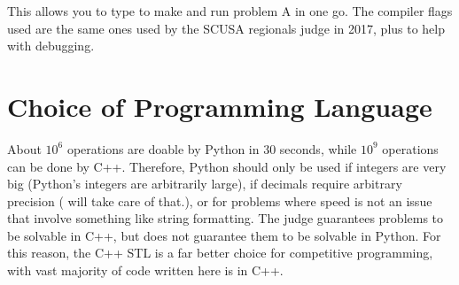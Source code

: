 \documentclass[../main]{subfiles}
\begin{document}
        This allows you to type  to make and run problem A in one go. The compiler flags used are the same ones used by the SCUSA regionals judge in 2017, plus  to help with debugging.

\section{Choice of Programming Language}

    About $10^6$ operations are doable by Python in 30 seconds, while $10^9$ operations can be done by C++. Therefore, Python should only be used if integers are very big (Python's integers are arbitrarily large), if decimals require arbitrary precision ( will take care of that.), or for problems where speed is not an issue that involve something like string formatting. The judge guarantees problems to be solvable in C++, but does not guarantee them to be solvable in Python. For this reason, the C++ STL is a far better choice for competitive programming, with  vast majority of code written here is in C++. 
\end{document}

